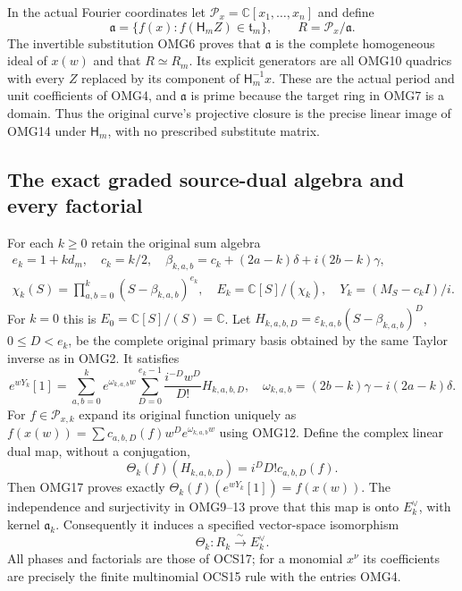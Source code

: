 \documentclass[11pt,a4paper]{article}
\begin{document}
In the actual Fourier coordinates let
$\mathscr P_x=\mathbb C[x_1,\ldots,x_n]$ and define
\[
 \mathfrak a=\{f(x):f(\mathsf H_mZ)\in\mathfrak t_m\},\qquad
 R=\mathscr P_x/\mathfrak a.
 \tag{OMG15}
\]
The invertible substitution OMG6 proves that $\mathfrak a$ is the
complete homogeneous ideal of $x(w)$ and that $R\simeq R_m$.
Its explicit generators are all OMG10 quadrics with every $Z$
replaced by its component of $\mathsf H_m^{-1}x$. These are the
actual period and unit coefficients of OMG4, and $\mathfrak a$
is prime because the target ring in OMG7 is a domain. Thus the
original curve's projective closure is the precise linear image
of OMG14 under $\mathsf H_m$, with no prescribed substitute matrix.

\subsection{The exact graded source-dual algebra and every factorial}
For each $k\ge0$ retain the original sum algebra
\[
\begin{gathered}
 e_k=1+kd_m,\quad c_k=k/2,\quad
 \beta_{k,a,b}=c_k+(2a-k)\delta+i(2b-k)\gamma,\\
 \chi_k(S)=\prod_{a,b=0}^k(S-\beta_{k,a,b})^{e_k},\quad
 E_k=\mathbb C[S]/(\chi_k),\quad Y_k=(M_S-c_kI)/i.
\end{gathered}\tag{OMG16}
\]
For $k=0$ this is $E_0=\mathbb C[S]/(S)=\mathbb C$. Let
$H_{k,a,b,D}=\varepsilon_{k,a,b}(S-\beta_{k,a,b})^D$,
$0\le D<e_k$, be the complete original primary basis obtained
by the same Taylor inverse as in OMG2. It satisfies
\[
 e^{wY_k}[1]=\sum_{a,b=0}^k e^{\omega_{k,a,b}w}
             \sum_{D=0}^{e_k-1}\frac{i^{-D}w^D}{D!}H_{k,a,b,D},
 \quad\omega_{k,a,b}=(2b-k)\gamma-i(2a-k)\delta.
 \tag{OMG17}
\]
For $f\in\mathscr P_{x,k}$ expand its original function uniquely as
$f(x(w))=\sum c_{a,b,D}(f)w^De^{\omega_{k,a,b}w}$ using OMG12.
Define the complex linear dual map, without a conjugation,
\[
 \Theta_k(f)(H_{k,a,b,D})=i^DD!c_{a,b,D}(f).
 \tag{OMG18}
\]
Then OMG17 proves exactly
$\Theta_k(f)(e^{wY_k}[1])=f(x(w))$.
The independence and surjectivity in OMG9--13 prove that this
map is onto $E_k^\vee$, with kernel $\mathfrak a_k$.
Consequently it induces a specified vector-space isomorphism
\[
 \boxed{\Theta_k:R_k\xrightarrow{\ \sim\ }E_k^\vee.}
 \tag{OMG19}
\]
All phases and factorials are those of OCS17; for a monomial
$x^\nu$ its coefficients are precisely the finite multinomial
OCS15 rule with the entries OMG4.
\end{document}
